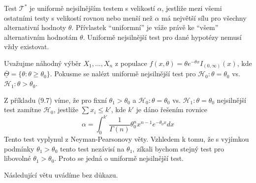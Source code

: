 Test $\mathscr{T}^*$ je uniformě nejsilnějším testem s velikostí $\alpha$, jestliže mezi všemi ostatními testy s velikostí rovnou nebo menší než $\alpha$ má největší sílu pro všechny alternativní hodnoty $\theta$. Přívlastek ``uniformní'' je váže právě ke ``všem'' alternativním hodnotám $\theta$. Uniformě nejsilnější test pro dané hypotézy nemusí vždy existovat.

\begin{example}
Uvažujme náhodný výběr $X_1, ..., X_n$ z populace $f(x, \theta) = \theta e^{-\theta x}I_{(0, \infty)}(x)$, kde $\overline{\underline{\Theta}} = \{\theta: \theta \ge \theta_0\}$. Pokusme se nalézt uniformě nejsilnější test pro $\mathscr{H}_0: \theta = \theta_0$ vs. $\mathscr{H}_1: \theta > \theta_0$.

Z příkladu (9.7) víme, že pro fixní $\theta_1 > \theta_0$ a   $\mathscr{H}_0: \theta = \theta_0$ vs. $\mathscr{H}_1: \theta = \theta_0$ nejsilnější test zamítne $\mathscr{H}_0$, jestliže $\sum x_i \le k'$, kde $k'$ je dáno řešením rovnice
\begin{equation*}
\alpha = \int_0^{k'} \frac{1}{\Gamma(n)}\theta_0^n x^{n - 1}e^{-\theta_0 x}dx
\end{equation*}
Tento test vyplynul z Neyman-Pearsonovy věty. Vzhledem k tomu, že s vyjímkou podmínky $\theta_1 > \theta_0$ tento test nezávisí na $\theta_1$, zíkali bychom stejný test pro libovolné $\theta_1 > \theta_0$. Proto se jedná o uniformě nejsilnější test.
\end{example}

Následující větu uvádíme bez důkazu.

